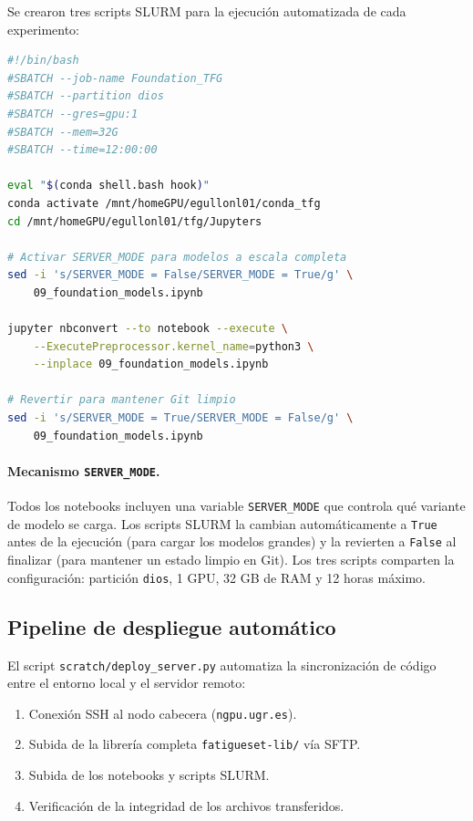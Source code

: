 \documentclass[12pt, a4paper]{article}
\newcommand{\code}[1]{\texttt{#1}}
\begin{document}
Se crearon tres scripts SLURM para la ejecución automatizada de cada experimento:

\begin{lstlisting}[language=bash, caption={Extracto de \code{run\_foundation\_server.sh}.}, label={lst:slurm_script}]
#!/bin/bash
#SBATCH --job-name Foundation_TFG
#SBATCH --partition dios
#SBATCH --gres=gpu:1
#SBATCH --mem=32G
#SBATCH --time=12:00:00

eval "$(conda shell.bash hook)"
conda activate /mnt/homeGPU/egullonl01/conda_tfg
cd /mnt/homeGPU/egullonl01/tfg/Jupyters

# Activar SERVER_MODE para modelos a escala completa
sed -i 's/SERVER_MODE = False/SERVER_MODE = True/g' \
    09_foundation_models.ipynb

jupyter nbconvert --to notebook --execute \
    --ExecutePreprocessor.kernel_name=python3 \
    --inplace 09_foundation_models.ipynb

# Revertir para mantener Git limpio
sed -i 's/SERVER_MODE = True/SERVER_MODE = False/g' \
    09_foundation_models.ipynb
\end{lstlisting}

\paragraph{Mecanismo \code{SERVER\_MODE}.}
Todos los notebooks incluyen una variable \code{SERVER\_MODE} que controla qué variante de modelo se carga. Los scripts SLURM la cambian automáticamente a \code{True} antes de la ejecución (para cargar los modelos grandes) y la revierten a \code{False} al finalizar (para mantener un estado limpio en Git). Los tres scripts comparten la configuración: partición \code{dios}, 1 GPU, 32 GB de RAM y 12 horas máximo.

\subsection{Pipeline de despliegue automático}

El script \code{scratch/deploy\_server.py} automatiza la sincronización de código entre el entorno local y el servidor remoto:

\begin{enumerate}
    \item Conexión SSH al nodo cabecera (\code{ngpu.ugr.es}).
    \item Subida de la librería completa \code{fatigueset-lib/} vía SFTP.
    \item Subida de los notebooks y scripts SLURM.
    \item Verificación de la integridad de los archivos transferidos.
\end{enumerate}
\end{document}
